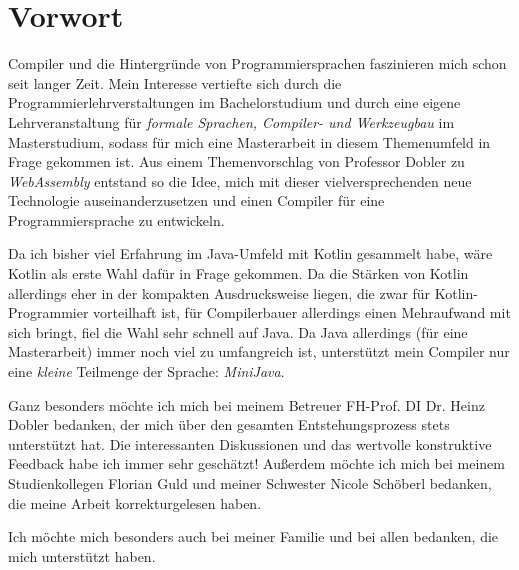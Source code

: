 \chapter{Vorwort}
 
Compiler und die Hintergründe von Programmiersprachen faszinieren mich schon seit langer Zeit. Mein Interesse vertiefte sich durch die Programmierlehrverstaltungen im Bachelorstudium und durch eine eigene Lehrveranstaltung für \emph{formale Sprachen, Compiler- und Werkzeugbau} im Masterstudium, sodass für mich eine Masterarbeit in diesem Themenumfeld in Frage gekommen ist. Aus einem Themenvorschlag von Professor Dobler zu \emph{WebAssembly} entstand so die Idee, mich mit dieser vielversprechenden neue Technologie auseinanderzusetzen und einen Compiler für eine Programmiersprache zu entwickeln.

Da ich bisher viel Erfahrung im Java-Umfeld mit Kotlin gesammelt habe, wäre Kotlin als erste Wahl dafür in Frage gekommen. Da die Stärken von Kotlin allerdings eher in der kompakten Ausdrucksweise liegen, die zwar für Kotlin-Programmier vorteilhaft ist, für Compilerbauer allerdings einen Mehraufwand mit sich bringt, fiel die Wahl sehr schnell auf Java. Da Java allerdings (für eine Masterarbeit) immer noch viel zu umfangreich ist, unterstützt mein Compiler nur eine \emph{kleine} Teilmenge der Sprache: \emph{MiniJava}.

Ganz besonders möchte ich mich bei meinem Betreuer FH-Prof. DI Dr. Heinz Dobler bedanken, der mich über den gesamten Entstehungsprozess stets unterstützt hat. Die interessanten Diskussionen und das wertvolle konstruktive Feedback habe ich immer sehr geschätzt! Außerdem möchte ich mich bei meinem Studienkollegen Florian Guld und meiner Schwester Nicole Schöberl bedanken, die meine Arbeit korrekturgelesen haben.

Ich möchte mich besonders auch bei meiner Familie und bei allen bedanken, die mich unterstützt haben.
